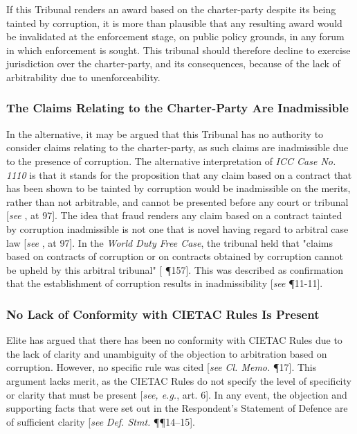 If this Tribunal renders an award based on the charter-party despite its being tainted by corruption, it is more than plausible that any resulting award would be invalidated at the enforcement stage, on public policy grounds, in any forum in which enforcement is sought. This tribunal should therefore decline to exercise jurisdiction over the charter-party, and its consequences, because of the lack of arbitrability due to unenforceability.

\subsubsection{The Claims Relating to the Charter-Party Are Inadmissible}

In the alternative, it may be argued that this Tribunal has no authority to consider claims relating to the charter-party, as such claims are inadmissible due to the presence of corruption. The alternative interpretation of \textit{ICC Case No. 1110} is that it stands for the proposition that any claim based on a contract that has been shown to be tainted by corruption would be inadmissible on the merits, rather than not arbitrable, and cannot be presented before any court or tribunal [\textit{see} \cite{Mourre 2006}, at 97]. The idea that fraud renders any claim based on a contract tainted by corruption inadmissible is not one that is novel having regard to arbitral case law [\textit{see} \cite{Mourre 2006}, at 97]. In the \textit{World Duty Free Case}, the tribunal held that "claims based on contracts of corruption or on contracts obtained by corruption cannot be upheld by this arbitral tribunal" [\cite{World Duty Free Case} \P 157]. This was described as confirmation that the establishment of corruption results in inadmissibility [\textit{see} \cite{Mourre 2009} \P 11-11]. 

\subsubsection{No Lack of Conformity with CIETAC Rules Is Present}

Elite has argued that there has been no conformity with CIETAC Rules due to the lack of clarity and unambiguity of the objection to arbitration based on corruption. However, no specific rule was cited [\textit{see} \textit{Cl. Memo.} \P 17]. This argument lacks merit, as the CIETAC Rules do not specify the level of specificity or clarity that must be present  [\textit{see, e.g.}, \cite{CIETAC Rules} art. 6]. In any event, the objection and supporting facts that were set out in the Respondent's Statement of Defence are of sufficient clarity [\textit{see} \textit{Def. Stmt.} \P\P 14--15]. 

